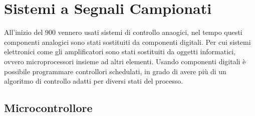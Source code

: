 \documentclass{article}
\numberwithin{equation}{subsection}
\begin{document}
\begin{center}\end{center}

\clearpage

\section{Sistemi a Segnali Campionati}

All'inizio del $900$ vennero usati sistemi di controllo anaogici, nel tempo questi componenti analogici sono stati sostituiti da componenti digitali. Per cui sistemi elettronici 
come gli amplificatori sono stati sostituiti da oggetti informatici, ovvero microprocessori insieme ad altri elementi. Usando componenti digitali è possibile programmare 
controllori schedulati, in grado di avere più di un algoritmo di controllo adatti per diversi stati del processo.    

\subsection{Microcontrollore}
\end{document}
